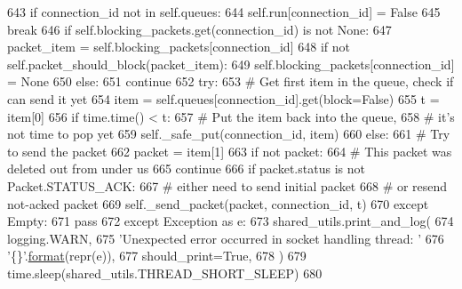 \begin{DoxyCode}
643                     \textcolor{keywordflow}{if} connection\_id \textcolor{keywordflow}{not} \textcolor{keywordflow}{in} self.queues:
644                         self.run[connection\_id] = \textcolor{keyword}{False}
645                         \textcolor{keywordflow}{break}
646                     \textcolor{keywordflow}{if} self.blocking\_packets.get(connection\_id) \textcolor{keywordflow}{is} \textcolor{keywordflow}{not} \textcolor{keywordtype}{None}:
647                         packet\_item = self.blocking\_packets[connection\_id]
648                         \textcolor{keywordflow}{if} \textcolor{keywordflow}{not} self.packet\_should\_block(packet\_item):
649                             self.blocking\_packets[connection\_id] = \textcolor{keywordtype}{None}
650                         \textcolor{keywordflow}{else}:
651                             \textcolor{keywordflow}{continue}
652                     \textcolor{keywordflow}{try}:
653                         \textcolor{comment}{# Get first item in the queue, check if can send it yet}
654                         item = self.queues[connection\_id].get(block=\textcolor{keyword}{False})
655                         t = item[0]
656                         \textcolor{keywordflow}{if} time.time() < t:
657                             \textcolor{comment}{# Put the item back into the queue,}
658                             \textcolor{comment}{# it's not time to pop yet}
659                             self.\_safe\_put(connection\_id, item)
660                         \textcolor{keywordflow}{else}:
661                             \textcolor{comment}{# Try to send the packet}
662                             packet = item[1]
663                             \textcolor{keywordflow}{if} \textcolor{keywordflow}{not} packet:
664                                 \textcolor{comment}{# This packet was deleted out from under us}
665                                 \textcolor{keywordflow}{continue}
666                             \textcolor{keywordflow}{if} packet.status \textcolor{keywordflow}{is} \textcolor{keywordflow}{not} Packet.STATUS\_ACK:
667                                 \textcolor{comment}{# either need to send initial packet}
668                                 \textcolor{comment}{# or resend not-acked packet}
669                                 self.\_send\_packet(packet, connection\_id, t)
670                     \textcolor{keywordflow}{except} Empty:
671                         \textcolor{keywordflow}{pass}
672                 \textcolor{keywordflow}{except} Exception \textcolor{keyword}{as} e:
673                     shared\_utils.print\_and\_log(
674                         logging.WARN,
675                         \textcolor{stringliteral}{'Unexpected error occurred in socket handling thread: '}
676                         \textcolor{stringliteral}{'\{\}'}.\hyperlink{namespaceparlai_1_1chat__service_1_1services_1_1messenger_1_1shared__utils_a32e2e2022b824fbaf80c747160b52a76}{format}(repr(e)),
677                         should\_print=\textcolor{keyword}{True},
678                     )
679             time.sleep(shared\_utils.THREAD\_SHORT\_SLEEP)
680 
\end{DoxyCode}
